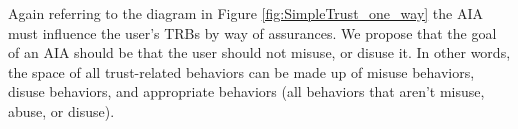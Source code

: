     Again referring to the diagram in Figure \ref{fig:SimpleTrust_one_way} the AIA must influence the user's TRBs by way of assurances. We propose that the goal of an AIA should be that the user should not misuse, or disuse it. In other words, the space of all trust-related behaviors can be made up of misuse behaviors, disuse behaviors, and appropriate behaviors (all behaviors that aren't misuse, abuse, or disuse).
    
%
    
    
